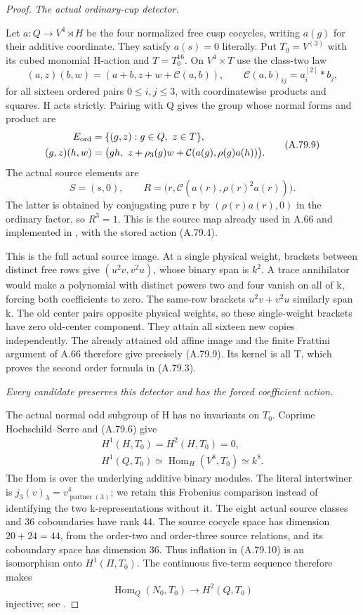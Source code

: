 \begin{proof}
\emph{The actual ordinary-cup detector.}\par
Let \(a:Q\to V^4\rtimes H\) be the four normalized free
cusp cocycles, writing \(a(g)\) for their additive coordinate.
They satisfy \(a(s)=0\) literally. Put
\(T_0=V^{(3)}\) with its cubed monomial H-action and
\(T=T_0^{16}\). On \(V^4\times T\) use the class-two law
\[
 (a,z)(b,w)=(a+b,z+w+\mathcal C(a,b)),
 \qquad \mathcal C(a,b)_{ij}=a_i^{[2]}*b_j,
 \tag{A.79.8}
\]
for all sixteen ordered pairs \(0\leq i,j\leq3\), with
coordinatewise products and squares. H acts strictly. Pairing
with Q gives the group whose normal forms and product are
\[
 \begin{aligned}
 E_{\rm ord}&=\{(g,z):g\in Q,\ z\in T\},\\
 (g,z)(h,w)&=
 \bigl(gh,\ z+\rho_3(g)w+
       \mathcal C(a(g),\rho(g)a(h))\bigr).
 \end{aligned}
 \tag{A.79.9}
\]
The actual source elements are
\[
 S=(s,0),\qquad
 R=\bigl(r,\mathcal C(a(r),\rho(r)^2a(r))\bigr).
\]
The latter is obtained by conjugating pure r by
\((\rho(r)a(r),0)\) in the ordinary factor, so \(R^3=1\).
This is the source map already used in A.66 and implemented in
, with the stored
action (A.79.4).

This is the full actual source image. At a single physical
weight, brackets between distinct free rows give
\((u^2v,v^2u)\), whose binary span is \(k^2\). A trace
annihilator would make a polynomial with distinct powers two
and four vanish on all of k, forcing both coefficients to zero.
The same-row brackets \(u^2v+v^2u\) similarly span k.
The old center pairs opposite physical weights, so these
single-weight brackets have zero old-center component.
They attain all sixteen new copies independently. The already
attained old affine image and the finite Frattini argument of
A.66 therefore give precisely (A.79.9). Its kernel is all T,
which proves the second order formula in (A.79.3).

\emph{Every candidate preserves this detector and has the forced
coefficient action.}\par
The actual normal odd subgroup of H has no invariants on
\(T_0\). Coprime Hochschild--Serre and (A.79.6) give
\[
 \begin{gathered}
 H^1(H,T_0)=H^2(H,T_0)=0,\\
 H^1(Q,T_0)\simeq
       \operatorname{Hom}_H(V^8,T_0)\simeq k^8.
 \end{gathered}
 \tag{A.79.10}
\]
The Hom is over the underlying additive binary modules.
The literal intertwiner is
\(j_3(v)_\lambda=v_{\operatorname{partner}(\lambda)}^4\);
we retain this Frobenius comparison instead of identifying the
two k-representations without it. The eight actual source
classes and 36 coboundaries have rank 44. The source cocycle
space has dimension \(20+24=44\), from the order-two and
order-three source relations, and its coboundary space has
dimension 36. Thus inflation in
(A.79.10) is an isomorphism onto \(H^1(\Pi,T_0)\).
The continuous five-term sequence therefore makes
\[
 \operatorname{Hom}_Q(N_0,T_0)
                 \longrightarrow H^2(Q,T_0)
 \tag{A.79.11}
\]
injective; see \citet{APoonen2017}.


\end{proof}
